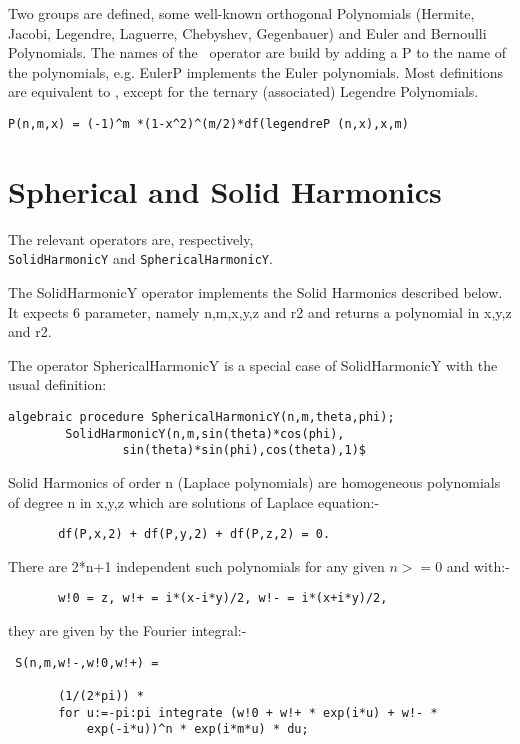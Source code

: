Two groups are defined, some well-known orthogonal Polynomials
(Hermite, Jacobi, Legendre, Laguerre, Chebyshev, Gegenbauer)
and Euler and Bernoulli Polynomials.
The names of the \REDUCE\  operator are build by adding a P
to the name
of the polynomials, e.g. EulerP implements the Euler polynomials.
Most definitions are equivalent to \cite{Abramowitz:72}, except
for the ternary (associated) Legendre Polynomials.

\begin{verbatim}
P(n,m,x) = (-1)^m *(1-x^2)^(m/2)*df(legendreP (n,x),x,m)
\end{verbatim}

\section{Spherical and Solid Harmonics}
 
 
The relevant operators are, respectively,\\
{\tt SolidHarmonicY} and {\tt SphericalHarmonicY}.

The SolidHarmonicY operator implements the Solid Harmonics
described below. It expects 6 parameter, namely n,m,x,y,z and r2
and returns a polynomial in x,y,z and r2.

The operator
SphericalHarmonicY is a special case of SolidHarmonicY
with the usual definition:

\begin{verbatim}
algebraic procedure SphericalHarmonicY(n,m,theta,phi);
        SolidHarmonicY(n,m,sin(theta)*cos(phi),
                sin(theta)*sin(phi),cos(theta),1)$
\end{verbatim}


Solid Harmonics of order n (Laplace polynomials)
are homogeneous polynomials of degree n in x,y,z
which are solutions of Laplace equation:-

\begin{verbatim}
       df(P,x,2) + df(P,y,2) + df(P,z,2) = 0.
\end{verbatim}

There are 2*n+1 independent such polynomials for any given $n >=0$
and with:-

\begin{verbatim}
       w!0 = z, w!+ = i*(x-i*y)/2, w!- = i*(x+i*y)/2,
\end{verbatim}

they are given by the Fourier integral:-

\begin{verbatim}
 S(n,m,w!-,w!0,w!+) =

       (1/(2*pi)) *
       for u:=-pi:pi integrate (w!0 + w!+ * exp(i*u) + w!- *
           exp(-i*u))^n * exp(i*m*u) * du;
\end{verbatim}

